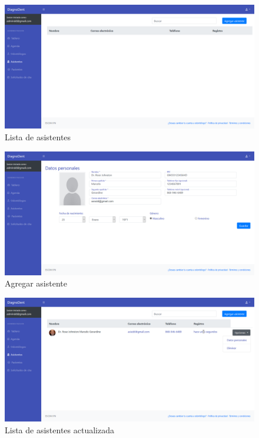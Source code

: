 \begin{figure}[H]
\centering
\includegraphics[width=17cm,keepaspectratio]{pictures/adminodo/asistentes/lista-asis-1.png}
\caption{Lista de asistentes}
\end{figure}

\begin{figure}[H]
\centering
\includegraphics[width=17cm,keepaspectratio]{pictures/adminodo/asistentes/agregar-asis.png}
\caption{Agregar asistente}
\end{figure}

\begin{figure}[H]
\centering
\includegraphics[width=17cm,keepaspectratio]{pictures/adminodo/asistentes/lista-asis-3.png}
\caption{Lista de asistentes actualizada}
\end{figure}

